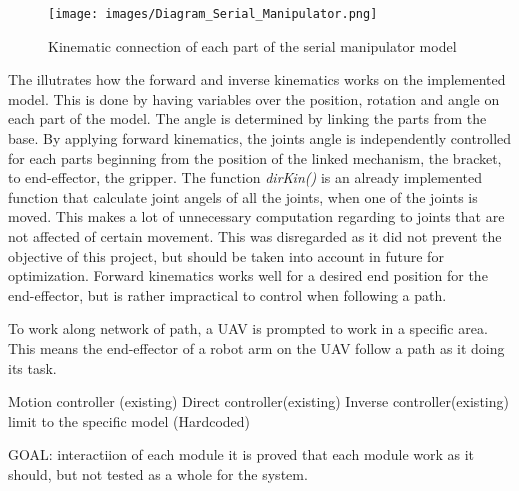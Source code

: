 \begin{figure}[ht]
    \centering
    \texttt{[image: images/Diagram\_Serial\_Manipulator.png]}
    \caption[Kinematic connection of  each part of the serial manipulator model]{Kinematic connection of  each part of the serial manipulator model}
    \label{fig:KinematicsSerialManipulator}
\end{figure}


The  illutrates how the forward and inverse kinematics works on the implemented model. This is done by having variables over the position, rotation and angle on each part of the model. The angle is determined by linking the parts from the base. By applying forward kinematics, the joints angle is independently controlled for each parts beginning from the position of the linked mechanism, the bracket, to end-effector, the gripper. The function \textit{dirKin()} is an already implemented function that calculate joint angels of all the joints, when one of the joints is moved. This makes a lot of unnecessary computation regarding to joints that are not affected of certain movement. This was disregarded as it did not prevent the objective of this project, but should be taken into account in future for optimization. Forward kinematics works well for a desired end position for the end-effector, but is rather impractical to control when following a path.

To work along network of path, a UAV is prompted to work in a specific area. This means the end-effector of a robot arm on the UAV follow a path as it doing its task. 



Motion controller (existing)
Direct controller(existing)
Inverse controller(existing)
limit to the specific model (Hardcoded)

GOAL: interactiion of each module
it is proved that each module work as it should, but not tested as a whole for the system.